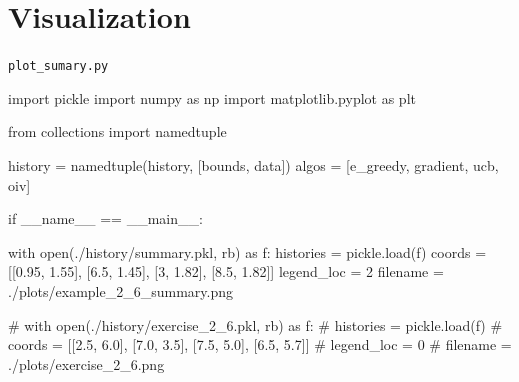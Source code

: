 \documentclass[
  letterpaper,
]{krantz}
\makeatletter
\newenvironment{Shaded}{\begin{snugshade}}{\end{snugshade}}
\newcommand{\BuiltInTok}[1]{\textcolor[rgb]{0.00,0.23,0.31}{#1}}
\newcommand{\CommentTok}[1]{\textcolor[rgb]{0.37,0.37,0.37}{#1}}
\newcommand{\ControlFlowTok}[1]{\textcolor[rgb]{0.00,0.23,0.31}{#1}}
\newcommand{\DecValTok}[1]{\textcolor[rgb]{0.68,0.00,0.00}{#1}}
\newcommand{\FloatTok}[1]{\textcolor[rgb]{0.68,0.00,0.00}{#1}}
\newcommand{\ImportTok}[1]{\textcolor[rgb]{0.00,0.46,0.62}{#1}}
\newcommand{\NormalTok}[1]{\textcolor[rgb]{0.00,0.23,0.31}{#1}}
\newcommand{\OperatorTok}[1]{\textcolor[rgb]{0.37,0.37,0.37}{#1}}
\newcommand{\StringTok}[1]{\textcolor[rgb]{0.13,0.47,0.30}{#1}}
\newcommand{\VariableTok}[1]{\textcolor[rgb]{0.07,0.07,0.07}{#1}}
\newenvironment{kframe}{%
\medskip{}
\setlength{\fboxsep}{.8em}
 \def\at@end@of@kframe{}%
 \ifinner\ifhmode%
  \def\at@end@of@kframe{\end{minipage}}%
  \begin{minipage}{\columnwidth}%
 \fi\fi%
 \def\FrameCommand##1{\hskip\@totalleftmargin \hskip-\fboxsep
 \colorbox{shadecolor}{##1}\hskip-\fboxsep
     \hskip-\linewidth \hskip-\@totalleftmargin \hskip\columnwidth}%
 \MakeFramed {\advance\hsize-\width
   \@totalleftmargin\z@ \linewidth\hsize
   \@setminipage}}%
 {\par\unskip\endMakeFramed%
 \at@end@of@kframe}
\renewenvironment{Shaded}{\begin{kframe}}{\end{kframe}}
\theoremstyle{plain}
\theoremstyle{definition}
\theoremstyle{definition}
\theoremstyle{remark}
\makeatother
\begin{document}
\section{Visualization}\label{visualization}

\begin{codelisting}

\caption{\texttt{plot\_sumary.py}}

\begin{Shaded}
\begin{Highlighting}[]
\ImportTok{import}\NormalTok{ pickle}
\ImportTok{import}\NormalTok{ numpy }\ImportTok{as}\NormalTok{ np}
\ImportTok{import}\NormalTok{ matplotlib.pyplot }\ImportTok{as}\NormalTok{ plt}

\ImportTok{from}\NormalTok{ collections }\ImportTok{import}\NormalTok{ namedtuple}

\NormalTok{history }\OperatorTok{=}\NormalTok{ namedtuple(}\StringTok{\textquotesingle{}history\textquotesingle{}}\NormalTok{, [}\StringTok{\textquotesingle{}bounds\textquotesingle{}}\NormalTok{, }\StringTok{\textquotesingle{}data\textquotesingle{}}\NormalTok{])}
\NormalTok{algos }\OperatorTok{=}\NormalTok{ [}\StringTok{\textquotesingle{}e\_greedy\textquotesingle{}}\NormalTok{, }\StringTok{\textquotesingle{}gradient\textquotesingle{}}\NormalTok{, }\StringTok{\textquotesingle{}ucb\textquotesingle{}}\NormalTok{, }\StringTok{\textquotesingle{}oiv\textquotesingle{}}\NormalTok{]}

\ControlFlowTok{if} \VariableTok{\_\_name\_\_} \OperatorTok{==} \StringTok{\textquotesingle{}\_\_main\_\_\textquotesingle{}}\NormalTok{:}
    
    \ControlFlowTok{with} \BuiltInTok{open}\NormalTok{(}\StringTok{\textquotesingle{}./history/summary.pkl\textquotesingle{}}\NormalTok{, }\StringTok{\textquotesingle{}rb\textquotesingle{}}\NormalTok{) }\ImportTok{as}\NormalTok{ f:}
\NormalTok{        histories }\OperatorTok{=}\NormalTok{ pickle.load(f)}
\NormalTok{        coords }\OperatorTok{=}\NormalTok{ [[}\FloatTok{0.95}\NormalTok{, }\FloatTok{1.55}\NormalTok{], [}\FloatTok{6.5}\NormalTok{, }\FloatTok{1.45}\NormalTok{], [}\DecValTok{3}\NormalTok{, }\FloatTok{1.82}\NormalTok{], [}\FloatTok{8.5}\NormalTok{, }\FloatTok{1.82}\NormalTok{]]}
\NormalTok{        legend\_loc }\OperatorTok{=} \DecValTok{2}
\NormalTok{        filename }\OperatorTok{=} \StringTok{\textquotesingle{}./plots/example\_2\_6\_summary.png\textquotesingle{}}
    
    \CommentTok{\# with open(\textquotesingle{}./history/exercise\_2\_6.pkl\textquotesingle{}, \textquotesingle{}rb\textquotesingle{}) as f:}
    \CommentTok{\#     histories = pickle.load(f)}
    \CommentTok{\#     coords = [[2.5, 6.0], [7.0, 3.5], [7.5, 5.0], [6.5, 5.7]]}
    \CommentTok{\#     legend\_loc = 0}
    \CommentTok{\#     filename = \textquotesingle{}./plots/exercise\_2\_6.png\textquotesingle{}}
    

\end{Highlighting}
\end{Shaded}
\end{codelisting}
\end{document}
